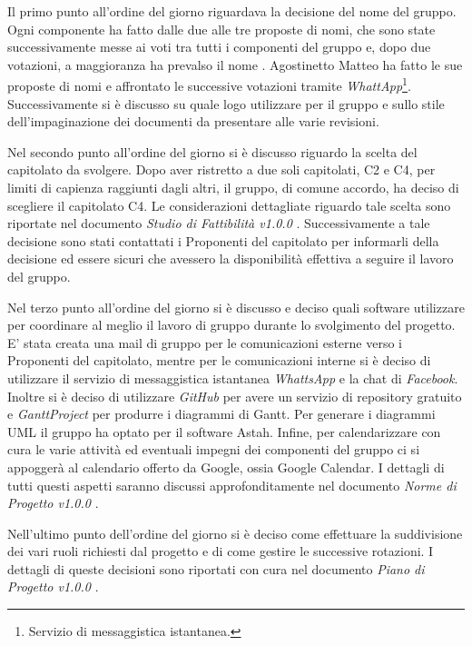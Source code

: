 Il primo punto all'ordine del giorno riguardava la decisione del nome del gruppo. Ogni componente ha fatto dalle due alle tre proposte di nomi, che sono state successivamente messe ai voti tra tutti i componenti del gruppo e, dopo due votazioni, a maggioranza ha prevalso il nome \GRUPPO. Agostinetto Matteo ha fatto le sue proposte di nomi e affrontato le successive votazioni tramite \textit{WhattApp}\footnote{Servizio di messaggistica istantanea.}. Successivamente si è discusso su quale logo utilizzare per il gruppo e sullo stile dell'impaginazione dei documenti da presentare alle varie revisioni.

\noindent Nel secondo punto all'ordine del giorno si è discusso riguardo la scelta del capitolato da svolgere. Dopo aver ristretto a due soli capitolati, C2 e C4, per limiti di capienza raggiunti dagli altri, il gruppo, di comune accordo, ha deciso di scegliere il capitolato C4. Le considerazioni dettagliate riguardo tale scelta sono riportate nel documento \textit{Studio di Fattibilità v1.0.0} . Successivamente a tale decisione sono stati contattati i Proponenti del capitolato per informarli della decisione ed essere sicuri che avessero la disponibilità effettiva a seguire il lavoro del gruppo.

\noindent Nel terzo punto all'ordine del giorno si è discusso e deciso quali software utilizzare per coordinare al meglio il lavoro di gruppo durante lo svolgimento del progetto. E' stata creata una mail di gruppo per le comunicazioni esterne verso i Proponenti del capitolato, mentre per le comunicazioni interne si è deciso di utilizzare il servizio di messaggistica istantanea \textit{WhattsApp} e la chat di \textit{Facebook}. Inoltre si è deciso di utilizzare \textit{GitHub} per avere un servizio di repository gratuito e \textit{GanttProject} per produrre i diagrammi di Gantt. Per generare i diagrammi UML il gruppo ha optato per il software Astah. Infine, per calendarizzare con cura le varie attività ed eventuali impegni dei componenti del gruppo ci si appoggerà al calendario offerto da Google, ossia Google Calendar. I dettagli di tutti questi aspetti saranno discussi approfonditamente nel documento \textit{Norme di Progetto v1.0.0} .

\noindent Nell'ultimo punto dell'ordine del giorno si è deciso come effettuare la suddivisione dei vari ruoli richiesti dal progetto e di come gestire le successive rotazioni. I dettagli di queste decisioni sono riportati con cura nel documento \textit{Piano di Progetto v1.0.0} .